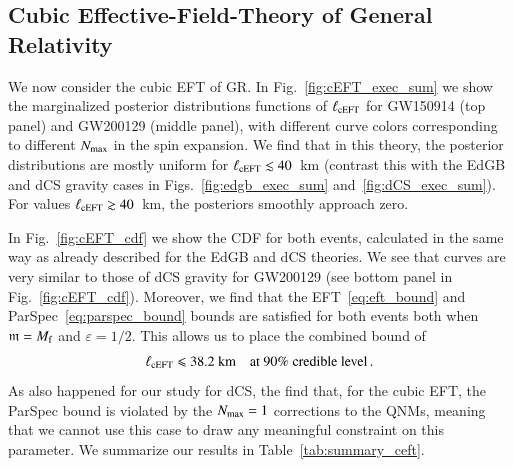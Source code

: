 \documentclass[twocolumn,
               prd,
               aps,
               superscriptaddress,
               tightenlines,
               nofootinbib,
               eqsecnum,
               amsfonts,
               amsmath,
               longbibliography]{revtex4-1}
\begin{document}
\subsection{Cubic Effective-Field-Theory of General Relativity}
\label{sec:results_ceft}

We now consider the cubic EFT of GR.
%
In Fig.~\ref{fig:cEFT_exec_sum} we show the marginalized posterior distributions
functions of $\ell_{\rm cEFT}$ for GW150914 (top panel) and GW200129 (middle panel),
with different curve colors corresponding to different $N_{\rm max}$ in
the spin expansion.
%
We find that in this theory, the posterior distributions are mostly uniform for
$\ell_{\rm cEFT} \lesssim 40$~km (contrast this with the EdGB and dCS gravity
cases in Figs.~\ref{fig:edgb_exec_sum} and~\ref{fig:dCS_exec_sum}).
%
For values $\ell_{\rm cEFT} \gtrsim 40$~km, the posteriors smoothly approach zero.

In Fig.~\ref{fig:cEFT_cdf} we show the CDF for both events, calculated in the
same way as already described for the EdGB and dCS theories.
%
We see that curves are very similar to those of dCS gravity for GW200129 (see
bottom panel in Fig.~\ref{fig:cEFT_cdf}).
%
Moreover, we find that the EFT~\eqref{eq:eft_bound} and
ParSpec~\eqref{eq:parspec_bound} bounds are satisfied for both events both when
$\mathfrak{m} = M_{\rm f}$ and $\varepsilon = 1/2$.
%
This allows us to place the combined bound of
%
\begin{equation}
    \ell_{\rm cEFT} \leqslant 38.2~\textrm{km} \quad \textrm{at 90\% credible level}\,.
\end{equation}
%
As also happened for our study for dCS, the find that, for
the cubic EFT, the ParSpec bound is violated by the $N_{\rm max} = 1$ corrections to
the QNMs, meaning that we cannot use this case to draw any meaningful
constraint on this parameter.
%
We summarize our results in Table~\ref{tab:summary_ceft}.
\end{document}
